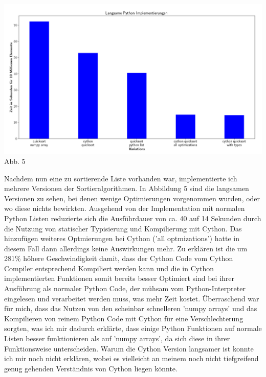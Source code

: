 \documentclass[12pt,a4paper]{article}
\begin{document}
\begin{center}
    \hspace*{-1.5cm}\includegraphics[width=1.2\textwidth]{./diagramme/matplotlib/pythonlangsam.png}
    Abb. 5
\end{center}

Nachdem nun eine zu sortierende Liste vorhanden war, implementierte ich mehrere Versionen der Sortieralgorithmen.
In Abbildung 5 sind die langsamen Versionen zu sehen, bei denen wenige Optimierungen vorgenommen wurden, oder wo diese nichts bewirkten.
Ausgehend von der Implementation mit normalen Python Listen reduzierte sich die Ausführdauer von ca. 40 auf 14 Sekunden
durch die Nutzung von statischer Typisierung und Kompilierung mit Cython. Das hinzufügen weiteres Optmierungen
bei Cython ('all optmizations') hatte in diesem Fall dann allerdings keine Auswirkungen mehr.
Zu erklären ist die um 281\% höhere Geschwindigkeit damit, dass der Cython Code vom Cython Compiler
entsprechend Kompiliert werden kann und die in Cython implementierten Funktionen somit bereits besser
Optimiert sind bei ihrer Ausführung als normaler Python Code, der mühsam vom Python-Interpreter eingelesen
und verarbeitet werden muss, was mehr Zeit kostet.
Überraschend war für mich, dass das Nutzen von den scheinbar schnelleren 'numpy arrays' und das Kompilieren
von reinem Python Code mit Cython für eine Verschlechterung sorgten, was ich mir dadurch erklärte, dass einige
Python Funktionen auf normale Listen besser funktionieren als auf 'numpy arrays', da sich diese in ihrer Funktionsweise
unterscheiden. Warum die Cython Version langsamer ist konnte ich mir noch nicht erklären, wobei es vielleicht an meinem
noch nicht tiefgreifend genug gehenden Verständnis von Cython liegen könnte.
\end{document}

